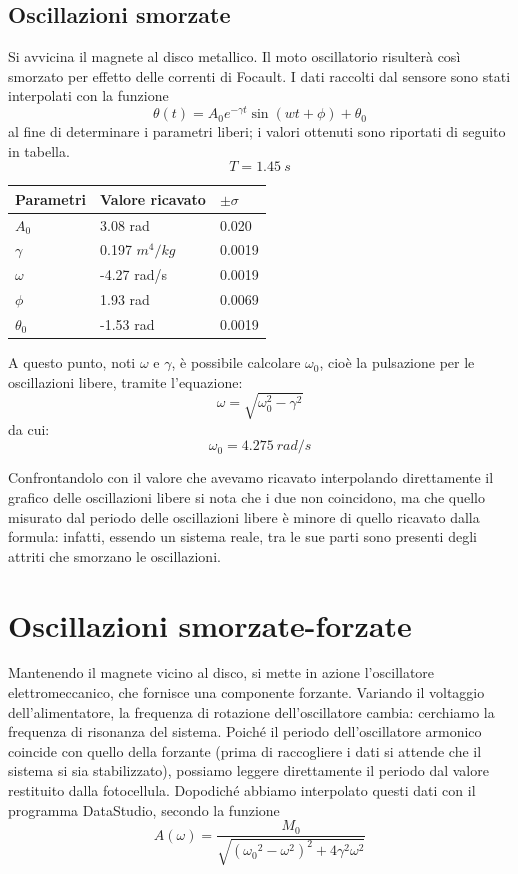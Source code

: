 \subsection{Oscillazioni smorzate}

Si avvicina il magnete al disco metallico. Il moto oscillatorio risulterà così smorzato per effetto delle correnti di Focault.
I dati raccolti dal sensore sono stati interpolati con la funzione
$$ \theta (t) = A_0 e^{- \gamma t} \sin(wt+\phi)+\theta_0 $$
al fine di determinare i parametri liberi; i valori ottenuti sono riportati di seguito in tabella.\\

$$T=1.45\ s$$

\begin{center}
\begin{tabular}{l|l|l}
\midrule
Parametri & Valore ricavato & $ \pm \sigma$ \\
\midrule
$A_0$ & 3.08 rad & 0.020\\
$\gamma$ & 0.197 $m^4/kg$& 0.0019\\
$\omega$ & -4.27 rad/s& 0.0019\\
$\phi$ & 1.93 rad & 0.0069 \\
$\theta_0$ & -1.53 rad& 0.0019 \\
\midrule
\end{tabular}
\end{center}

A questo punto, noti $\omega$ e $\gamma$, è possibile calcolare $ \omega_0 $, cioè la pulsazione per le oscillazioni libere, tramite l'equazione:
\begin{equation}\label{eq:omega}
\omega = \sqrt{\omega_0^2 - \gamma^2}
\end{equation} da cui:
$$\omega_0 = 4.275\ rad/s$$

Confrontandolo con il valore che avevamo ricavato interpolando direttamente il grafico delle oscillazioni libere si nota che i due non coincidono, ma che quello misurato dal periodo delle oscillazioni libere è minore di quello ricavato dalla formula: infatti, essendo un sistema reale, tra le sue parti sono presenti degli attriti che smorzano le oscillazioni.

\section{Oscillazioni smorzate-forzate}

Mantenendo il magnete vicino al disco, si mette in azione l'oscillatore elettromeccanico, che fornisce una componente forzante. Variando il voltaggio dell'alimentatore,  la frequenza di rotazione dell'oscillatore cambia: cerchiamo la frequenza di risonanza del sistema.
Poiché il periodo dell'oscillatore armonico coincide con quello della forzante (prima di raccogliere i dati si attende che il sistema si sia stabilizzato), possiamo leggere direttamente il periodo dal valore restituito dalla fotocellula.
Dopodiché abbiamo interpolato questi dati con il programma DataStudio, secondo la funzione
\begin{equation} \label{A}
A(\omega) = \frac{M_0}{\sqrt{ ({\omega_0}^2-\omega^2)^2 + 4\gamma^2\omega^2}}
\end{equation}

